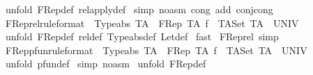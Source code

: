 \begin{isabellebody}
%
\isadelimproof
%
\endisadelimproof
%
\isatagproof
{}\isamarkupfalse%
\ {\isacharparenleft}unfold\ FRep{\isacharunderscore}def\ rel{\isacharunderscore}apply{\isacharunderscore}def{\isacharparenright}\isanewline
{}\isamarkupfalse%
\ {\isacharparenleft}simp\ {\isacharparenleft}no{\isacharunderscore}asm{\isacharparenright}\ cong\ add{\isacharcolon}\ conj{\isacharunderscore}cong{\isacharparenright}\isanewline
{}\isamarkupfalse%
%
\endisatagproof
{\isafoldproof}%
%
\isadelimproof
\isanewline
%
\endisadelimproof
\isanewline
{}\isamarkupfalse%
\ FRep{\isacharunderscore}rel{\isacharbrackleft}rule{\isacharunderscore}format{\isacharbrackright}\ {\isacharcolon}\ {\isachardoublequoteopen}Typeabs\ TA\ {\isacharminus}{\isacharminus}{\isachargreater}\ {\isacharparenleft}FRep\ TA\ f{\isacharparenright}\ {\isacharcolon}\ {\isacharparenleft}{\isacharparenleft}TASet\ TA{\isacharparenright}\ {\isacharless}{\isacharminus}{\isacharminus}{\isachargreater}\ UNIV{\isacharparenright}{\isachardoublequoteclose}\isanewline
%
\isadelimproof
%
\endisadelimproof
%
\isatagproof
{}\isamarkupfalse%
\ {\isacharparenleft}unfold\ FRep{\isacharunderscore}def\ rel{\isacharunderscore}def\ Typeabs{\isacharunderscore}def\ Let{\isacharunderscore}def{\isacharparenright}\isanewline
{}\isamarkupfalse%
\ fast\isanewline
{}\isamarkupfalse%
%
\endisatagproof
{\isafoldproof}%
%
\isadelimproof
\isanewline
%
\endisadelimproof
\isanewline
{}\isamarkupfalse%
\ FRep{\isacharunderscore}rel\ {\isacharbrackleft}simp{\isacharbrackright}\isanewline
\isanewline
{}\isamarkupfalse%
\ FRep{\isacharunderscore}pfun{\isacharbrackleft}rule{\isacharunderscore}format{\isacharbrackright}\ {\isacharcolon}\ {\isachardoublequoteopen}Typeabs\ TA\ {\isacharminus}{\isacharminus}{\isachargreater}\ {\isacharparenleft}FRep\ TA\ f{\isacharparenright}\ {\isacharcolon}\ {\isacharparenleft}{\isacharparenleft}TASet\ TA{\isacharparenright}\ {\isacharminus}{\isacharbar}{\isacharminus}{\isachargreater}\ UNIV{\isacharparenright}{\isachardoublequoteclose}\isanewline
%
\isadelimproof
%
\endisadelimproof
%
\isatagproof
{}\isamarkupfalse%
\ {\isacharparenleft}unfold\ pfun{\isacharunderscore}def{\isacharparenright}\isanewline
{}\isamarkupfalse%
\ {\isacharparenleft}simp\ {\isacharparenleft}no{\isacharunderscore}asm{\isacharparenright}{\isacharparenright}\isanewline
{}\isamarkupfalse%
\ {\isacharparenleft}unfold\ FRep{\isacharunderscore}def{\isacharparenright}\isanewline

\end{isabellebody}
